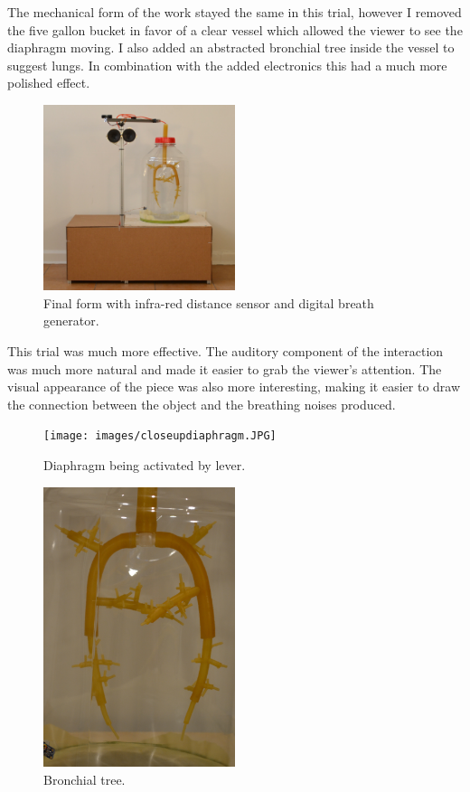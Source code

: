 \documentclass[letterpaper]{article}
\begin{document}

The mechanical form of the work stayed the same in this trial, however I removed the five gallon bucket in favor of a clear vessel which allowed the viewer to see the diaphragm moving. I also added an abstracted bronchial tree inside the vessel to suggest lungs. In combination with the added electronics this had a much more polished effect.

\begin{figure}[h]
\includegraphics[width=0.5\textwidth]{images/finaltrial.JPG}
\caption{Final form with infra-red distance sensor and digital breath generator.}
\end{figure}


This trial was much more effective. The auditory component of the interaction was much more natural and made it easier to grab the viewer's attention. The visual appearance of the piece was also more interesting, making it easier to draw the connection between the object and the breathing noises produced. 

\begin{figure}[h]
\texttt{[image: images/closeupdiaphragm.JPG]}
\caption{Diaphragm being activated by lever.}
  \label{fig:denki}
\end{figure}

\begin{figure}[h]
\includegraphics[width=0.5\textwidth]{images/closeupbronchialtree.JPG}
\caption{Bronchial tree.}
\end{figure}
\end{document}
